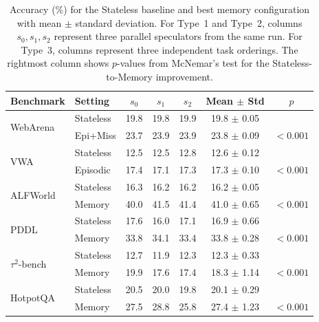 \begin{table}[h]
\centering
\caption{Accuracy (\%) for the Stateless baseline and best memory configuration with mean $\pm$ standard deviation. For Type~1 and Type~2, columns $s_0, s_1, s_2$ represent three parallel speculators from the same run. For Type~3, columns represent three independent task orderings. The rightmost column shows $p$-values from McNemar's test for the Stateless-to-Memory improvement.}
\label{tab:speculator_variance}
\small
\setlength{\tabcolsep}{3.5pt}
\begin{tabular}{llccccc}
\toprule
Benchmark & Setting & $s_0$ & $s_1$ & $s_2$ & Mean $\pm$ Std & $p$ \\
\midrule
\multirow{2}{*}{WebArena}
  & Stateless      & 19.8 & 19.8 & 19.9 & 19.8 $\pm$ 0.05 & \\
  & Epi+Miss        & 23.7 & 23.9 & 23.9 & 23.8 $\pm$ 0.09 & $< 0.001$ \\
\midrule
\multirow{2}{*}{VWA}
  & Stateless      & 12.5 & 12.5 & 12.8 & 12.6 $\pm$ 0.12 & \\
  & Episodic        & 17.4 & 17.1 & 17.3 & 17.3 $\pm$ 0.10 & $< 0.001$ \\
\midrule
\multirow{2}{*}{ALFWorld}
  & Stateless      & 16.3 & 16.2 & 16.2 & 16.2 $\pm$ 0.05 & \\
  & Memory          & 40.0 & 41.5 & 41.4 & 41.0 $\pm$ 0.65 & $< 0.001$ \\
\midrule
\multirow{2}{*}{PDDL}
  & Stateless      & 17.6 & 16.0 & 17.1 & 16.9 $\pm$ 0.66 & \\
  & Memory          & 33.8 & 34.1 & 33.4 & 33.8 $\pm$ 0.28 & $< 0.001$ \\
\midrule
\multirow{2}{*}{$\tau^{2}$-bench}
  & Stateless      & 12.7 & 11.9 & 12.3 & 12.3 $\pm$ 0.33 & \\
  & Memory          & 19.9 & 17.6 & 17.4 & 18.3 $\pm$ 1.14 & $< 0.001$ \\
\midrule
\multirow{2}{*}{HotpotQA}
  & Stateless      & 20.5 & 20.0 & 19.8 & 20.1 $\pm$ 0.29 & \\
  & Memory          & 27.5 & 28.8 & 25.8 & 27.4 $\pm$ 1.23 & $< 0.001$ \\
\bottomrule
\end{tabular}
\end{table}